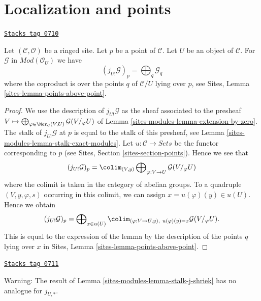\section{Localization and points}
\label{sites-modules-section-localize-points}
\begin{lemma}
\label{sites-modules-lemma-stalk-j-shriek}
\href{https://stacks.math.columbia.edu/tag/0710}{\texttt{Stacks tag 0710}}

Let $(\mathcal{C}, \mathcal{O})$ be a ringed site.
Let $p$ be a point of $\mathcal{C}$. Let $U$ be an object of $\mathcal{C}$.
For $\mathcal{G}$ in $\textit{Mod}(\mathcal{O}_U)$ we have
$$
(j_{U!}\mathcal{G})_p =
\bigoplus\nolimits_q \mathcal{G}_q
$$
where the coproduct is over the points $q$ of $\mathcal{C}/U$
lying over $p$, see
Sites, Lemma \ref{sites-lemma-points-above-point}.
\end{lemma}

\begin{proof}
We use the description of $j_{U!}\mathcal{G}$ as the sheaf associated
to the presheaf
$V \mapsto
\bigoplus\nolimits_{\varphi \in \Mor_\mathcal{C}(V, U)}
\mathcal{G}(V/_\varphi U)$
of
Lemma \ref{sites-modules-lemma-extension-by-zero}.
The stalk of $j_{U!}\mathcal{G}$ at $p$ is equal to the
stalk of this presheaf, see
Lemma \ref{sites-modules-lemma-stalk-exact-modules}.
Let $u : \mathcal{C} \to \textit{Sets}$ be the functor corresponding
to $p$ (see Sites, Section \ref{sites-section-points}).
Hence we see that
$$
(j_{U!}\mathcal{G})_p = \colim_{(V, y)}
\bigoplus\nolimits_{\varphi : V \to U} \mathcal{G}(V/_\varphi U)
$$
where the colimit is taken in the category of abelian groups.
To a quadruple $(V, y, \varphi, s)$ occurring in this colimit, we can assign
$x = u(\varphi)(y) \in u(U)$. Hence we obtain
$$
(j_{U!}\mathcal{G})_p =
\bigoplus\nolimits_{x \in u(U)}
\colim_{(\varphi : V \to U, y), \ u(\varphi)(y) = x} \mathcal{G}(V/_\varphi U).
$$
This is equal to the expression of the lemma by the description
of the points $q$ lying over $x$ in
Sites, Lemma \ref{sites-lemma-points-above-point}.
\end{proof}

\begin{remark}
\label{sites-modules-remark-not-pushforward}
\href{https://stacks.math.columbia.edu/tag/0711}{\texttt{Stacks tag 0711}}

Warning: The result of
Lemma \ref{sites-modules-lemma-stalk-j-shriek}
has no analogue for $j_{U, *}$.
\end{remark}

